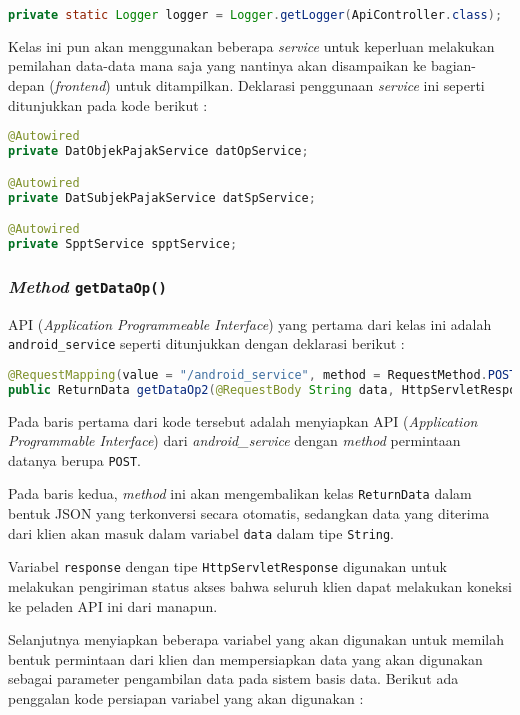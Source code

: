 \documentclass[pdftex,12pt, oneside]{article}
\begin{document}
\begin{lstlisting}[language=java]
private static Logger logger = Logger.getLogger(ApiController.class);
\end{lstlisting}

Kelas ini pun akan menggunakan beberapa \textit{service} untuk keperluan melakukan pemilahan data-data mana saja yang nantinya akan disampaikan ke bagian-depan (\textit{frontend}) untuk ditampilkan. Deklarasi penggunaan \textit{service} ini seperti ditunjukkan pada kode berikut :

\begin{lstlisting}[language=java]
@Autowired
private DatObjekPajakService datOpService;

@Autowired
private DatSubjekPajakService datSpService;

@Autowired
private SpptService spptService;
\end{lstlisting}

\subsubsection{\textit{Method} \texttt{getDataOp()}}

API (\textit{Application Programmeable Interface}) yang pertama dari kelas ini adalah \texttt{android\_service} seperti ditunjukkan dengan deklarasi berikut :

\begin{lstlisting}[language=java]
@RequestMapping(value = "/android_service", method = RequestMethod.POST)
public ReturnData getDataOp2(@RequestBody String data, HttpServletResponse response) {}    
\end{lstlisting}

Pada baris pertama dari kode tersebut adalah menyiapkan API (\textit{Application Programmable Interface}) dari \textit{android\_service} dengan \textit{method} permintaan datanya berupa \texttt{POST}.

Pada baris kedua, \textit{method} ini akan mengembalikan kelas \texttt{ReturnData} dalam bentuk JSON yang terkonversi secara otomatis, sedangkan data yang diterima dari klien akan masuk dalam variabel \texttt{data} dalam tipe \texttt{String}.

Variabel \texttt{response} dengan tipe \texttt{HttpServletResponse} digunakan untuk melakukan pengiriman status akses bahwa seluruh klien dapat melakukan koneksi ke peladen API ini dari manapun.

Selanjutnya menyiapkan beberapa variabel yang akan digunakan untuk memilah bentuk permintaan dari klien dan mempersiapkan data yang akan digunakan sebagai parameter pengambilan data pada sistem basis data. Berikut ada penggalan kode persiapan variabel yang akan digunakan :
\end{document}
